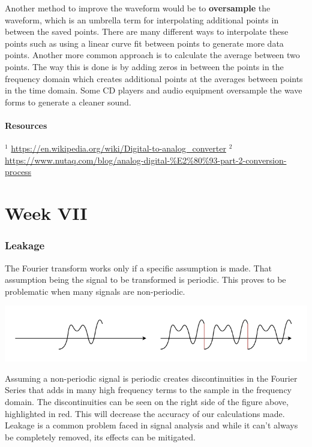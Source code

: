 \documentclass[12pt]{article}
\newcommand{\partcontent}{}
\begin{document}
Another method to improve the waveform would be to  \textbf{oversample} the waveform, which is an umbrella term for interpolating additional points in between the saved points. There are many different ways to interpolate these points such as using a linear curve fit between points to generate more data points. Another more common approach is to calculate the average between two points. The way this is done is by adding zeros in between the points in the frequency domain which creates additional points at the averages between points in the time domain. Some CD players and audio equipment oversample the wave forms to generate a cleaner sound.





\subsection*{Resources}
$^1$ \url{https://en.wikipedia.org/wiki/Digital-to-analog_converter}
$^2$ \url{https://www.nutaq.com/blog/analog-digital-%E2%80%93-part-2-conversion-process}
\part*{Week VII}
\renewcommand\partcontent{Week VII}

\section{Leakage}
The Fourier transform works only if a specific assumption is made. That assumption being the signal to be transformed is periodic. This proves to be problematic when many signals are non-periodic. \\
\begin{center}
\includegraphics[scale=1]{nonperiodicleakage}
\end{center}
Assuming a non-periodic signal is periodic creates discontinuities in the Fourier Series that adds in many high frequency terms to the sample in the frequency domain. The discontinuities can be seen on the right side of the figure above, highlighted in red. This will decrease the accuracy of our calculations made. Leakage is a common problem faced in signal analysis and while it can't always be completely removed, its effects can be mitigated.
\end{document}
